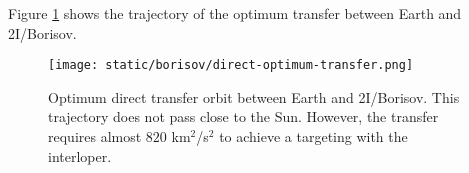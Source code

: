 Figure \ref{fig:borisov-direct-transfer-orbit} shows the trajectory of the
optimum transfer between Earth and 2I/Borisov.

\begin{figure}[H]
  \centering
  \texttt{[image: static/borisov/direct-optimum-transfer.png]}
  \caption{Optimum direct transfer orbit between Earth and 2I/Borisov. This
        trajectory does not pass close to the Sun. However, the transfer requires almost $820$
        km$^2$/s$^2$ to achieve a targeting with the interloper.}
  \label{fig:borisov-direct-transfer-orbit}
\end{figure}
